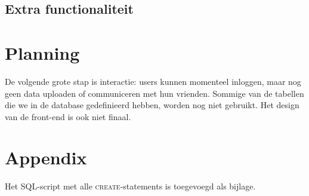 \documentclass[12pt,a4paper]{article}
\begin{document}
\subsection{Extra functionaliteit}

\section{Planning}
De volgende grote stap is interactie: users kunnen momenteel inloggen, maar nog
geen data uploaden of communiceren met hun vrienden. Sommige van de tabellen 
die we in de database gedefinieerd hebben, worden nog niet gebruikt. Het design 
van de front-end is ook niet finaal.

\section{Appendix}
Het SQL-script met alle \textsc{create}-statements is toegevoegd als bijlage.
\end{document}
